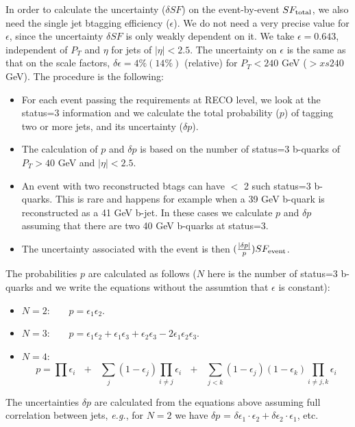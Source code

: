 In order to calculate the uncertainty ($\delta SF$) on the event-by-event $SF_{\rm total}$,
we also need the single jet btagging efficiency ($\epsilon$).  
We do not need a very precise value for $\epsilon$, since the uncertainty $\delta SF$ is 
only weakly dependent on it.  We take $\epsilon = 0.643$, independent of $P_T$
and $\eta$ for jets of $|\eta| < 2.5$.  The uncertainty on $\epsilon$ is 
the same as that on the scale factors, $\delta \epsilon = 4\% (14\%)$ (relative)
for $P_T < 240$ GeV ($>xs 240$ GeV).
The procedure is the following:
\begin{itemize}

\item For each event passing the requirements at RECO level, we look at the status=3 information
and we calculate the total probability ($p$) of tagging two or more jets, and 
its uncertainty ($\delta p$).

\item The calculation of $p$ and $\delta p$ is based on the number of status=3 b-quarks
of $P_T > 40$ GeV and $|\eta| < 2.5$.  

\item An event with two reconstructed btags can have $<$ 2 such status=3 b-quarks.  This 
is rare and happens for example when a 39 GeV b-quark is reconstructed as a 41 GeV
b-jet.  In these cases we calculate $p$ and $\delta p$ assuming that there are 
two 40 GeV b-quarks at status=3.

\item The uncertainty associated with the event is then $(\frac{|\delta p|}{p}) SF_{\rm event}$.

\end{itemize}

The probabilities $p$ are calculated as follows ($N$ here is the number of status=3 b-quarks
and we write the equations without the assumtion that $\epsilon$ is constant):

\begin{itemize}

\item $N=2$:~~~~$p = \epsilon_1 \epsilon_2$.

\item $N=3$:~~~~$p = \epsilon_1 \epsilon_2 + \epsilon_1 \epsilon_3 + \epsilon_2 \epsilon_3 -
2\epsilon_1 \epsilon_2 \epsilon_3$.

\item $N=4$:~~~~$$p = \prod{\epsilon_i}~~~+~~~\sum_j{(1-\epsilon_j)\prod_{i \ne j}{\epsilon_i}}
~~~+~~~\sum_{j<k}{(1-\epsilon_j)(1-\epsilon_k)\prod_{i \ne j,k}{\epsilon_i}}$$



\end{itemize}

The uncertainties $\delta p$ are calculated from the equations above assuming full 
correlation between jets, {\em e.g.}, for $N=2$ we have 
$\delta p$ = $\delta \epsilon_1 \cdot \epsilon_2 + \delta \epsilon_2 \cdot \epsilon_1$, etc.

